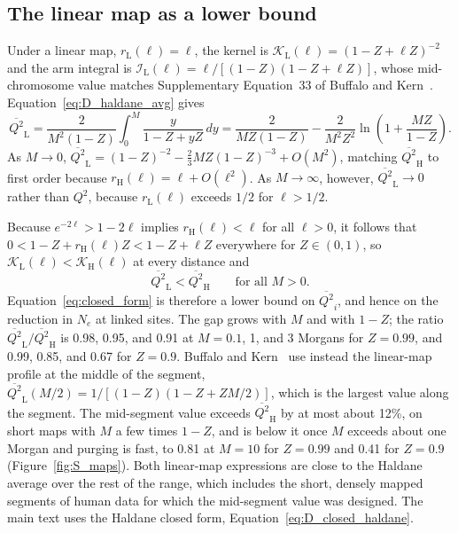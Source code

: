 \documentclass{article}
\begin{document}
\subsection{The linear map as a lower bound}\label{app:D_linear}
Under a linear map, $r_\text{L}(\ell) = \ell$, the kernel is $\mathcal{K}_\text{L}(\ell) = (1 - Z + \ell Z)^{-2}$ and the arm integral is $\mathcal{I}_\text{L}(\ell) = \ell/[(1-Z)(1-Z+\ell Z)]$, whose mid-chromosome value matches Supplementary Equation~33 of Buffalo and Kern~\cite{buffaloKern2024}. Equation~\eqref{eq:D_haldane_avg} gives
\begin{equation}
    \overline{Q^2}_\text{L} = \frac{2}{M^2(1-Z)}\int_0^M \frac{y}{1-Z+yZ}\,dy = \frac{2}{MZ(1-Z)} - \frac{2}{M^2Z^2}\ln\!\left(1+\frac{MZ}{1-Z}\right).
\label{eq:closed_form}
\end{equation}
As $M \to 0$, $\overline{Q^2}_\text{L} = (1-Z)^{-2} - \tfrac{2}{3}MZ(1-Z)^{-3} + O(M^2)$, matching $\overline{Q^2}_\text{H}$ to first order because $r_\text{H}(\ell) = \ell + O(\ell^2)$. As $M \to \infty$, however, $\overline{Q^2}_\text{L} \to 0$ rather than $Q^2$, because $r_\text{L}(\ell)$ exceeds $1/2$ for $\ell > 1/2$.

Because $e^{-2\ell} > 1 - 2\ell$ implies $r_\text{H}(\ell) < \ell$ for all $\ell > 0$, it follows that $0 < 1 - Z + r_\text{H}(\ell)Z < 1 - Z + \ell Z$ everywhere for $Z \in (0, 1)$, so $\mathcal{K}_\text{L}(\ell) < \mathcal{K}_\text{H}(\ell)$ at every distance and
\begin{equation}
    \overline{Q^2}_\text{L} < \overline{Q^2}_\text{H} \qquad \text{for all } M > 0.
\end{equation}
Equation~\eqref{eq:closed_form} is therefore a lower bound on $\overline{Q^2}_i$, and hence on the reduction in $N_e$ at linked sites. The gap grows with $M$ and with $1-Z$; the ratio $\overline{Q^2}_\text{L}/\overline{Q^2}_\text{H}$ is 0.98, 0.95, and 0.91 at $M = 0.1$, 1, and 3 Morgans for $Z = 0.99$, and 0.99, 0.85, and 0.67 for $Z = 0.9$. Buffalo and Kern~\cite{buffaloKern2024} use instead the linear-map profile at the middle of the segment, $\overline{Q^2}_\text{L}(M/2) = 1/[(1-Z)(1-Z+ZM/2)]$, which is the largest value along the segment. The mid-segment value exceeds $\overline{Q^2}_\text{H}$ by at most about 12\%, on short maps with $M$ a few times $1-Z$, and is below it once $M$ exceeds about one Morgan and purging is fast, to 0.81 at $M = 10$ for $Z = 0.99$ and 0.41 for $Z = 0.9$ (Figure~\ref{fig:S_maps}). Both linear-map expressions are close to the Haldane average over the rest of the range, which includes the short, densely mapped segments of human data for which the mid-segment value was designed. The main text uses the Haldane closed form, Equation~\eqref{eq:D_closed_haldane}.
\end{document}
